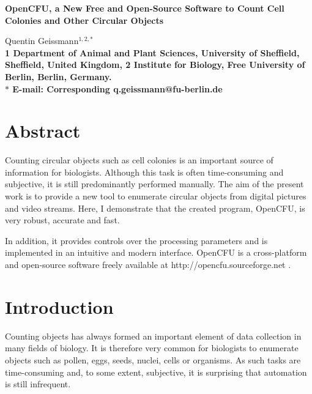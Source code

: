 \documentclass[10pt]{article}
\date{}
\newcommand{\website}{http://opencfu.sourceforge.net}
\begin{document}

\begin{flushleft}
{\Large
\textbf{OpenCFU, a New Free and Open-Source Software to Count Cell Colonies and
Other Circular Objects}}

Quentin Geissmann$^{1,2,\ast}$
\\


\bf{1} Department of Animal and Plant Sciences, University of Sheffield,
Sheffield, United Kingdom, \bf{2} Institute for Biology, Free University of
Berlin, Berlin, Germany. \\ $\ast$ E-mail: Corresponding
q.geissmann@fu-berlin.de
\end{flushleft}

\section*{Abstract}

Counting circular objects such as cell colonies is an important source of
information for biologists.
Although this task is often time-consuming and subjective, it is still
predominantly performed manually. The aim of the present work is to provide a
new tool to enumerate circular objects from digital pictures and video streams.
Here, I demonstrate that the created program, OpenCFU, is very robust, accurate and
fast.

In addition, it provides controls over the processing parameters and is
implemented in an intuitive and modern interface. OpenCFU is a cross-platform
and open-source software freely available at \website{} .

\section*{Introduction}

Counting objects has always formed an important element of data collection in
many fields of biology.
It is therefore very common for
biologists to enumerate objects such as pollen\cite{costa_counting_2009},
eggs\cite{mello_image_2008}, seeds\cite{severini_counting_2011},
nuclei\cite{forero_deadeasy_2010}, cells\cite{kachouie_arraycount_2009} or organisms\cite{yati_flycounter:_2011}.
As such tasks are time-consuming and, to some extent, subjective, it is
surprising that automation is still infrequent.
\end{document}
